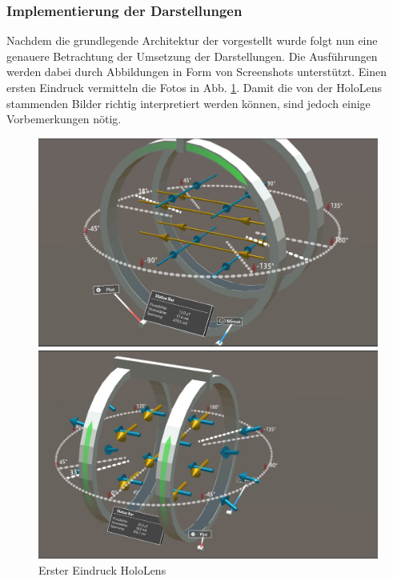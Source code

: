 \subsubsection{Implementierung der Darstellungen}
\label{sec-5-2-2}
Nachdem die grundlegende Architektur der vorgestellt wurde folgt nun eine genauere Betrachtung der Umsetzung der Darstellungen. Die Ausführungen werden dabei durch Abbildungen in Form von Screenshots unterstützt. Einen ersten Eindruck vermitteln die Fotos in Abb. \ref{img:HL_SS_Intro}. Damit die von der HoloLens stammenden Bilder richtig interpretiert werden können, sind jedoch einige Vorbemerkungen nötig.

\begin{figure}[h!]
	\centering
	\includegraphics[width=\textwidth]{images/HL_SS1.jpg}

	\vspace{0.25cm}

	\includegraphics[width=\textwidth]{images/HL_SS2.jpg}
	\caption{Erster Eindruck HoloLens}
	\label{img:HL_SS_Intro}
\end{figure}

